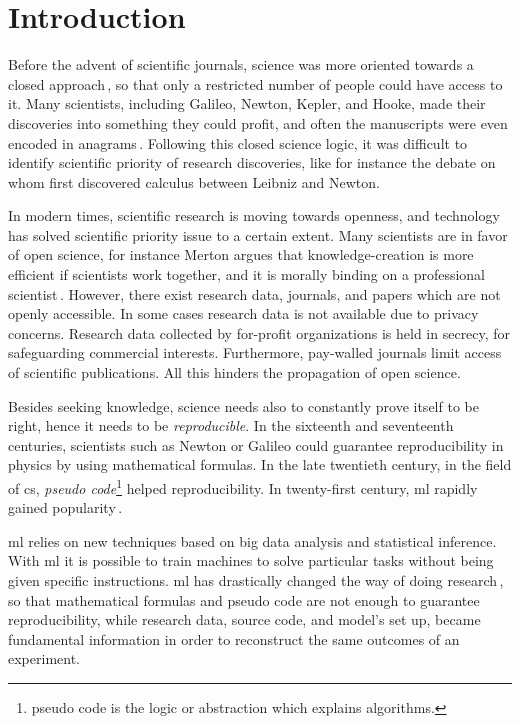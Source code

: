 \section{Introduction}
Before the advent of scientific journals,
science was more oriented towards a closed approach\,\cite{nielsen2011reinventing},
so that only a restricted number of people could have access to it.
Many scientists, including Galileo, Newton, Kepler, and Hooke, made their discoveries into
something they could profit, and often the manuscripts were even encoded in anagrams\,\cite{nielsen2011reinventing}.
Following this closed science logic, it was difficult
to identify scientific priority of research discoveries, like for instance the
debate on whom first discovered calculus between Leibniz and Newton.

In modern times, scientific research is moving towards openness,
and technology has solved scientific priority issue to a certain extent.
Many scientists are in favor of open science, for instance
Merton argues that knowledge-creation is more efficient if scientists work together, and
it is morally binding on a professional scientist\,\cite{merton1942science}.
However, there exist research data, journals, and papers which are not openly accessible.
In some cases research data is not available due to privacy concerns.
Research data collected by for-profit organizations is held in secrecy, for
safeguarding commercial interests.
Furthermore, pay-walled journals limit access of scientific publications.
All this hinders the propagation of open science.

Besides seeking knowledge, science needs also to constantly prove itself
to be right, hence it needs to be \emph{reproducible}. 
In the sixteenth and seventeenth centuries, scientists such as Newton or Galileo could guarantee
reproducibility in physics by using mathematical formulas.
%
In the late twentieth century, in the field of \ac{cs},
\emph{pseudo code}\footnote{pseudo code is the logic or abstraction which explains algorithms.}
helped reproducibility.
In twenty-first century, \ac{ml} rapidly gained popularity\,\cite{mjolsness2001machine}.

\ac{ml} relies on new techniques based on big data analysis and statistical inference.
With \ac{ml} it is possible to train machines to solve particular tasks without being
given specific instructions.
%
\ac{ml} has drastically changed the way of doing research\,\cite{anderson2008end},
so that mathematical formulas and pseudo code are not
enough to guarantee reproducibility, while research data, source code,
and model's set up, became fundamental information in order to reconstruct the
same outcomes of an experiment.

